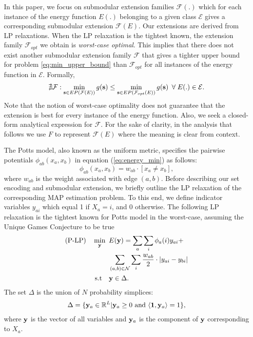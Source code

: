 In this paper, we focus on submodular extension families $\mathcal F(.)$ which
for each instance of the energy function $E(.)$ belonging to a given class $\mathcal E$ gives a corresponding
submodular extension ${\mathcal F}(E)$. Our extensions are derived from LP relaxations. When the LP relaxation is the tightest known, the extension family ${\mathcal
F}_{opt}$ we obtain is \emph{worst-case optimal}. This implies that there does not
exist another submodular extension family ${\mathcal F}$ that gives a tighter
upper bound for problem \eqref{eq:min_upper_bound} than ${\mathcal F}_{opt}$
for all instances of the energy function in $\mathcal E$. Formally, 
\begin{equation}
    \nexists {\mathcal F}: \min_{{\bf s} \in EP({\mathcal F}(E))} g({\bf s})
    \leq \min_{{\bf s} \in EP({\mathcal F}_{opt}(E))} g({\bf s}) \enspace
    \forall \; E(.) \in \mathcal E.
    \label{eq:best_submod}
\end{equation}
Note that the notion of worst-case optimality does not guarantee that the extension is best for every instance of the energy function. 
Also, we seek a closed-form analytical expression for $\mathcal F$. For the sake of clarity,
in the analysis that follows we use $F$ to represent ${\mathcal F}(E)$ where
the meaning is clear from context.


The Potts model, also known as the uniform metric, specifies the pairwise potentials $\phi_{ab}(x_a, x_b)$ in equation (\ref{eq:energy_min}) as follows:
\begin{equation}
    \phi_{ab}(x_a, x_b) = w_{ab} \cdot [x_a \neq x_b],
\end{equation}
where $w_{ab}$ is the weight associated with edge $(a, b)$. 
%
 Before describing our set encoding and submodular extension, we briefly outline the LP relaxation of the corresponding MAP estimation problem. To this end, we define indicator variables $y_{ai}$ which equal 1 if $X_a = i$, and 0 otherwise. The following LP relaxation is the tightest known for Potts model in the worst-case, assuming the Unique Games Conjecture to be true \citep{manokaran2008sdp}
\begin{align}
    \text{(P-LP)} \quad \min_{\bf y} \enskip & E({\bf y}) =  \sum_{a} \sum_{i} \phi_a(i)y_{ai} + \nonumber\\
     &\sum_{(a, b) \in {\mathcal N}} \sum_{i} \frac{w_{ab}}{2} \cdot |y_{ai} - y_{bi}| \nonumber\\
    \text{s.t} \quad &{\bf y} \in \Delta.
\label{eq:p-lp}
\end{align}
The set $\Delta$ is the union of $N$ probability simplices:
\begin{equation}
    \Delta = \{{\bf y}_a \in \mathbb{R}^L | {\bf y}_a \geq 0  \textrm{ and } \langle {\bf 1}, {\bf y}_a \rangle = 1\},
    \label{eq:delta}
\end{equation}
where $\bf y$ is the vector of all variables and ${\bf y}_a$ is the component
of $\bf y$ corresponding to $X_a$.


